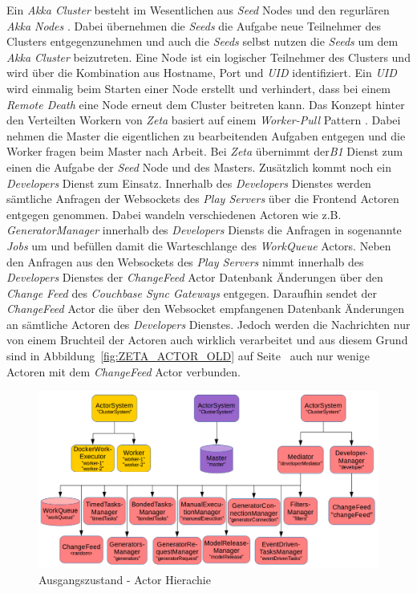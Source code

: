 Ein \textit{Akka Cluster} besteht im Wesentlichen aus \textit{Seed} Nodes und den regurlären \textit{Akka Nodes} \cite{akka_cluster}. Dabei übernehmen die \textit{Seeds} die Aufgabe neue Teilnehmer des Clusters entgegenzunehmen und auch die \textit{Seeds} selbst nutzen die \textit{Seeds} um dem \textit{Akka Cluster} beizutreten. Eine Node ist ein logischer Teilnehmer des Clusters und wird über die Kombination aus Hostname, Port und \textit{UID} identifiziert. Ein \textit{UID} wird einmalig beim Starten einer Node erstellt und verhindert, dass bei einem \textit{Remote Death} eine Node erneut dem Cluster beitreten kann. Das Konzept hinter den Verteilten Workern von \textit{Zeta} basiert auf einem \textit{Worker-Pull} Pattern \cite{akka_worker_pull}. Dabei nehmen die Master die eigentlichen zu bearbeitenden Aufgaben entgegen und die Worker fragen beim Master nach Arbeit. Bei \textit{Zeta} übernimmt der\textit{B1} Dienst zum einen die Aufgabe der \textit{Seed} Node und des Masters. Zusätzlich kommt noch ein \textit{Developers} Dienst zum Einsatz. Innerhalb des \textit{Developers} Dienstes werden sämtliche Anfragen der Websockets des \textit{Play Servers} über die Frontend Actoren entgegen genommen. Dabei wandeln verschiedenen Actoren wie z.B. \textit{GeneratorManager} innerhalb des \textit{Developers} Diensts die Anfragen in sogenannte \textit{Jobs} um und befüllen damit die Warteschlange des \textit{WorkQueue} Actors. Neben den Anfragen aus den Websockets des \textit{Play Servers} nimmt innerhalb des \textit{Developers} Dienstes der \textit{ChangeFeed} Actor Datenbank Änderungen über den \textit{Change Feed} des \textit{Couchbase Sync Gateways} entgegen. Daraufhin sendet der \textit{ChangeFeed} Actor die über den Websocket empfangenen Datenbank Änderungen an sämtliche Actoren des \textit{Developers} Dienstes. Jedoch werden die Nachrichten nur von einem Bruchteil der Actoren auch wirklich verarbeitet und aus diesem Grund sind in Abbildung~\ref{fig:ZETA_ACTOR_OLD} auf Seite~\pageref{fig:ZETA_ACTOR_OLD} auch nur wenige Actoren mit dem \textit{ChangeFeed} Actor verbunden.

\begin{figure}
    \centering
    \includegraphics[width=5in]{figures/actor_hierachy_before.png}
    \caption{Ausgangszustand - Actor Hierachie}
    \label{fig:ZETA_HIERACHY_OLD}
\end{figure}

